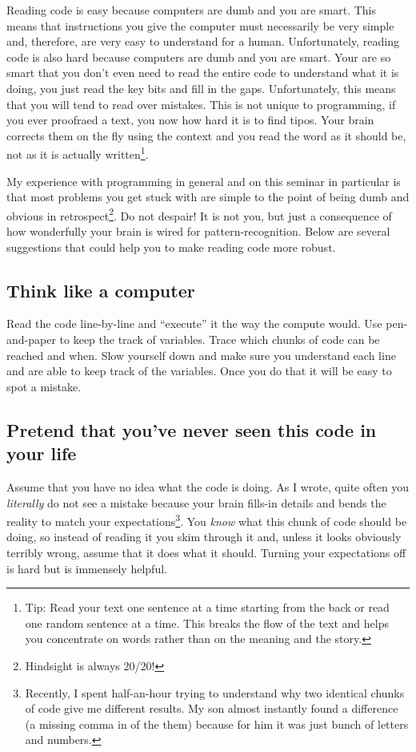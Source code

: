 \documentclass[
]{book}
\begin{document}
Reading code is easy because computers are dumb and you are smart. This means that instructions you give the computer must necessarily be very simple and, therefore, are very easy to understand for a human. Unfortunately, reading code is also hard because computers are dumb and you are smart. Your are so smart that you don't even need to read the entire code to understand what it is doing, you just read the key bits and fill in the gaps. Unfortunately, this means that you will tend to read over mistakes. This is not unique to programming, if you ever proofraed a text, you now how hard it is to find tipos. Your brain corrects them on the fly using the context and you read the word as it should be, not as it is actually written\footnote{Tip: Read your text one sentence at a time starting from the back or read one random sentence at a time. This breaks the flow of the text and helps you concentrate on words rather than on the meaning and the story.}.

My experience with programming in general and on this seminar in particular is that most problems you get stuck with are simple to the point of being dumb and obvious in retrospect\footnote{Hindsight is always 20/20!}. Do not despair! It is not you, but just a consequence of how wonderfully your brain is wired for pattern-recognition. Below are several suggestions that could help you to make reading code more robust.

\hypertarget{think-like-a-computer}{%
\subsection{Think like a computer}\label{think-like-a-computer}}

Read the code line-by-line and ``execute'' it the way the compute would. Use pen-and-paper to keep the track of variables. Trace which chunks of code can be reached and when. Slow yourself down and make sure you understand each line and are able to keep track of the variables. Once you do that it will be easy to spot a mistake.

\hypertarget{pretend-that-youve-never-seen-this-code-in-your-life}{%
\subsection{Pretend that you've never seen this code in your life}\label{pretend-that-youve-never-seen-this-code-in-your-life}}

Assume that you have no idea what the code is doing. As I wrote, quite often you \emph{literally} do not see a mistake because your brain fills-in details and bends the reality to match your expectations\footnote{Recently, I spent half-an-hour trying to understand why two identical chunks of code give me different results. My son almost instantly found a difference (a missing comma in of the them) because for him it was just bunch of letters and numbers.}. You \emph{know} what this chunk of code should be doing, so instead of reading it you skim through it and, unless it looks obviously terribly wrong, assume that it does what it should. Turning your expectations off is hard but is immensely helpful.
\end{document}

